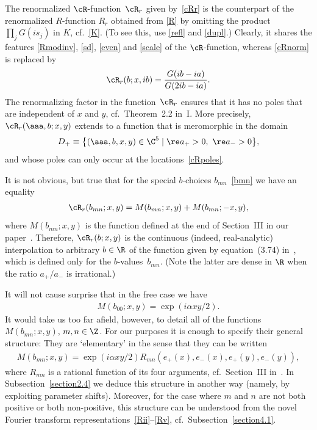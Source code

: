 The renormalized $\cR$-function~$\cR_r$ given by~\eqref{cRr}
is the counterpart of the renormalized $R$-function $R_r$ obtained from \eqref{R} by omitting the product $\prod_jG(is_j)$ in $K$, cf.~\eqref{K}. (To see this, use \eqref{refl} and \eqref{dupl}.) Clearly, it shares the features \eqref{Rmodinv}, \eqref{sd}, \eqref{even} and \eqref{scale} of the $\cR$-function, whereas \eqref{cRnorm} is replaced by
\begin{gather}\label{cRrnorm}
\cR_r(b;x,ib)=\frac{G(ib-ia)}{G(2ib-ia)}.
\end{gather}
The renormalizing factor in the function~$\cR_r$ ensures that it has no poles that are independent of $x$ and $y$, cf.~Theorem~2.2 in~I. More precisely, $\cR_r(\aaa,b;x,y)$ extends to a function that is meromorphic in the domain{\samepage
\begin{gather}\label{Dp}
D_+\equiv \big\{ (\aaa,b,x,y)\in \C^5 \mid \re a_+>0,\ \re a_->0\big\},
\end{gather}
and whose poles can only occur at the locations~\eqref{cRpoles}.}

It is not obvious, but true that for the special $b$-choices $b_{mn}$~\eqref{bmn}
we have an equality
\begin{gather}\label{cRM}
\cR_r(b_{mn};x,y)=M(b_{mn};x,y)+M(b_{mn};-x,y),
\end{gather}
where $M(b_{mn};x,y)$ is the function def\/ined at the end of Section~III in our paper~\cite{GLFII}. Therefore, $\cR_r(b;x,y)$ is the continuous (indeed, real-analytic) interpolation to arbitrary $b\in\R$ of  the function given by equation~(3.74) in~\cite{GLFII}, which is def\/ined only for the $b$-values~$b_{mn}$. (Note the latter are dense in $\R$ when the ratio $a_{+}/a_{-}$ is irrational.)

It will not cause surprise that in the free case we have
\begin{gather}\label{M00}
M(b_{00};x,y)=\exp(i\alpha xy/2).
\end{gather}
It would take us too far af\/ield, however, to detail all of the functions $M(b_{mn};x,y)$, $m,n\in\Z$. For our purposes it is enough to specify their general structure: They are `elementary' in the sense that they can be written
\begin{gather}\label{Mform}
M(b_{mn};x,y)=\exp(i\alpha xy/2)R_{mn}(e_{+}(x),e_{-}(x),e_{+}(y),e_{-}(y)),
\end{gather}
where $R_{mn}$ is a rational function of its four arguments, cf.~Section~III in~\cite{GLFII}. In Subsection~\ref{section2.4} we deduce this structure in another way (namely, by exploiting parameter shifts). Moreover, for the case where $m$ and $n$ are not both positive or both non-positive, this structure can be understood from the novel Fourier transform representations~\eqref{Rii}--\eqref{Rv}, cf.~Subsection~\ref{section4.1}.

